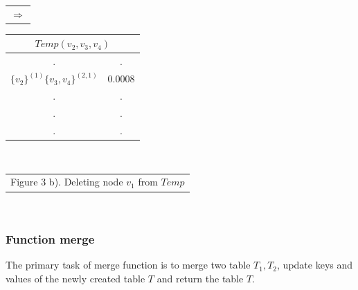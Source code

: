 \documentclass[12pt]{article}
\begin{document}
\begin{table}[!htb]
\begin{minipage}{.06\linewidth}
        \begin{tabular}{c}
     $ \Rightarrow$\\
        \end{tabular}
    \end{minipage}%
    \begin{minipage}{.3\linewidth}
      \centering
     \begin{tabular}{cc}
\multicolumn{2}{c}{$Temp(v_2,v_3,v_4)$}                           \\ \hline
\multicolumn{1}{|c}{.} & \multicolumn{1}{|c|}{.} \\ \hline
  \multicolumn{1}{|l}{$\{v_2\}^{(1)}\{v_3,v_4\}^{(2,1)}$} & \multicolumn{1}{|l|}{$0.0008$} \\ \hline         
                   \multicolumn{1}{|c}{.} & \multicolumn{1}{|c|}{.} \\ \hline                 
                   \multicolumn{1}{|c}{.} & \multicolumn{1}{|c|}{.} \\ \hline
                   \multicolumn{1}{|c}{.} & \multicolumn{1}{|c|}{.} \\ \hline        
\end{tabular}
    \end{minipage}\\
      \begin{minipage}{1.0\linewidth}
       \centering

        \begin{tabular}{c}
Figure 3 b). Deleting node $v_1$ from $Temp$
        \end{tabular}
    \end{minipage}\\
\end{table}
\subsubsection{Function merge}
\label{subsub:Mrg}
The primary task of merge function is to merge two table $T_1, T_2$, update keys and values of the newly created table $T$ and return the table $T$.
\end{document}
